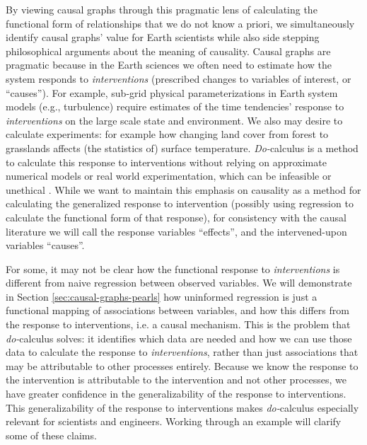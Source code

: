 \documentclass[12pt]{article}
\begin{document}
By viewing causal graphs through this pragmatic lens of calculating
the functional form of relationships that we do not know a priori, we
simultaneously identify causal graphs' value for Earth scientists
while also side stepping philosophical arguments about the meaning of
causality. Causal graphs are pragmatic because in the Earth sciences
we often need to estimate how the system responds to
\emph{interventions} (prescribed changes to variables of interest, or
``causes''). For example, sub-grid physical parameterizations in Earth
system models (e.g., turbulence) require estimates of the time
tendencies' response to \emph{interventions} on the large scale state
and environment. We also may desire to calculate experiments: for
example how changing land cover from forest to grasslands affects (the
statistics of) surface temperature. \textit{Do-}calculus is a method
to calculate this response to interventions without relying on
approximate numerical models or real world experimentation, which can
be infeasible or unethical \citep[as is the case for geoengineering;
e.g., unilateral decisions to seed the oceans with iron, or spray
aerosols in the atmosphere,][]{hamilton2013no}. While we want to
maintain this emphasis on causality as a method for calculating the
generalized response to intervention (possibly using regression to
calculate the functional form of that response), for consistency with
the causal literature we will call the response variables ``effects'',
and the intervened-upon variables ``causes''.

For some, it may not be clear how the functional response to
\emph{interventions} is different from naive regression between
observed variables. We will demonstrate in Section
\ref{sec:causal-graphs-pearls} how uninformed regression is just a
functional mapping of associations between variables, and how this
differs from the response to interventions, i.e. a causal
mechanism. This is the problem that \textit{do-}calculus solves: it
identifies which data are needed and how we can use those data to
calculate the response to \emph{interventions}, rather than just
associations that may be attributable to other processes
entirely. Because we know the response to the intervention is
attributable to the intervention and not other processes, we have
greater confidence in the generalizability of the response to
interventions.  This generalizability of the response to interventions
makes \textit{do-}calculus especially relevant for scientists and
engineers. Working through an example will clarify some of these
claims.
\end{document}
